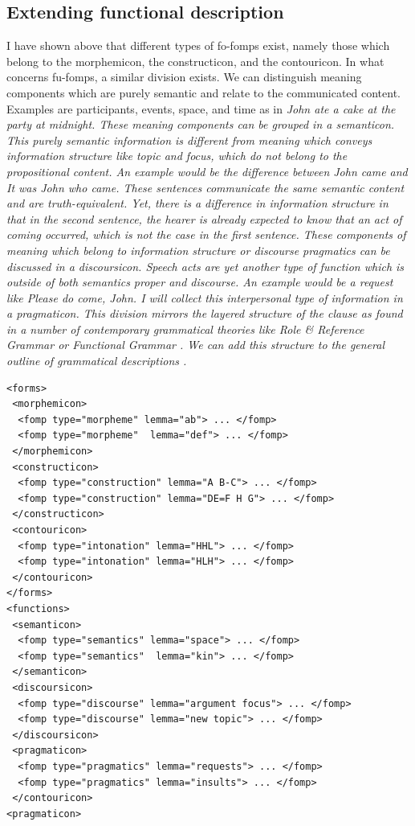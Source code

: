 \documentclass[a4paper,12pt]{article}
\begin{document}
\subsection{Extending functional description}
I have shown above that different types of fo-fomps exist, namely those which belong to the morphemicon, the constructicon, and the contouricon. In what concerns fu-fomps, a similar division exists. We can distinguish meaning components which are purely semantic and relate to the communicated content. Examples are participants, events, space, and time as in \em John ate a cake at the party at midnight\em. These meaning components can be grouped in a \em semanticon\em. This purely semantic information is different from meaning which conveys information structure like topic and focus, which do not belong to the propositional content. An example would be the difference between \em John came \em and \em It was John who came\em. These sentences communicate the same semantic content and are truth-equivalent. Yet, there is a difference in information structure in that in the second sentence, the hearer is already expected to know that an act of coming occurred, which is not the case in the first sentence. These components of meaning which belong to information structure or discourse pragmatics can be discussed in a \em discoursicon\em. Speech acts are yet another type of function which is outside of both semantics proper and discourse. An example would be a request like \em Please do come, John\em. I will collect this interpersonal type of information in a \em pragmaticon\em. This division mirrors the layered structure of the clause as found in a number of contemporary grammatical theories like Role \& Reference Grammar  \citep{FoleyEtAl1984,VanValinEtAl1997rrg} or Functional Grammar \citep{Hengeveld1989,HengeveldEtAl2008fdg}. We can add this structure to the general outline of grammatical descriptions .
\ea\label{xml:fufofomp}
\begin{verbatim} 
<forms>
 <morphemicon>
  <fomp type="morpheme" lemma="ab"> ... </fomp>
  <fomp type="morpheme"  lemma="def"> ... </fomp>
 </morphemicon>
 <constructicon>
  <fomp type="construction" lemma="A B-C"> ... </fomp>
  <fomp type="construction" lemma="DE=F H G"> ... </fomp>
 </constructicon>
 <contouricon>
  <fomp type="intonation" lemma="HHL"> ... </fomp>
  <fomp type="intonation" lemma="HLH"> ... </fomp>
 </contouricon>
</forms>
<functions>
 <semanticon>
  <fomp type="semantics" lemma="space"> ... </fomp>
  <fomp type="semantics"  lemma="kin"> ... </fomp>
 </semanticon>
 <discoursicon>
  <fomp type="discourse" lemma="argument focus"> ... </fomp>
  <fomp type="discourse" lemma="new topic"> ... </fomp>
 </discoursicon>
 <pragmaticon>
  <fomp type="pragmatics" lemma="requests"> ... </fomp>
  <fomp type="pragmatics" lemma="insults"> ... </fomp>
 </contouricon>
<pragmaticon>
\end{verbatim} 
\z
\end{document}
